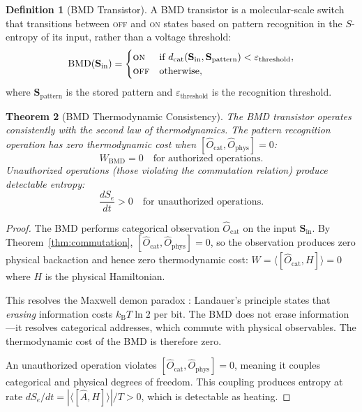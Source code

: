 \documentclass[12pt]{article}
\newtheorem{theorem}{Theorem}[section]
\theoremstyle{definition}
\newtheorem{definition}[theorem]{Definition}
\theoremstyle{remark}
\newcommand{\Se}{S_e}
\newcommand{\kB}{k_{\mathrm{B}}}
\newcommand{\Ocat}{\hat{O}_{\mathrm{cat}}}
\newcommand{\Ophys}{\hat{O}_{\mathrm{phys}}}
\begin{document}
\begin{definition}[BMD Transistor]
\label{def:bmd}
A BMD transistor is a molecular-scale switch that transitions between \textsc{off} and \textsc{on} states based on pattern recognition in the $S$-entropy of its input, rather than a voltage threshold:
\begin{equation}
  \mathrm{BMD}(\mathbf{S}_{\mathrm{in}}) =
  \begin{cases}
    \textsc{on} & \text{if } d_{\mathrm{cat}}(\mathbf{S}_{\mathrm{in}}, \mathbf{S}_{\mathrm{pattern}}) < \varepsilon_{\mathrm{threshold}}, \\
    \textsc{off} & \text{otherwise},
  \end{cases}
  \label{eq:bmd}
\end{equation}
where $\mathbf{S}_{\mathrm{pattern}}$ is the stored pattern and $\varepsilon_{\mathrm{threshold}}$ is the recognition threshold.
\end{definition}

\begin{theorem}[BMD Thermodynamic Consistency]
\label{thm:bmd_thermo}
The BMD transistor operates consistently with the second law of thermodynamics. The pattern recognition operation has zero thermodynamic cost when $[\Ocat, \Ophys] = 0$:
\begin{equation}
  W_{\mathrm{BMD}} = 0 \quad \text{for authorized operations}.
  \label{eq:bmd_work}
\end{equation}
Unauthorized operations (those violating the commutation relation) produce detectable entropy:
\begin{equation}
  \frac{d\Se}{dt} > 0 \quad \text{for unauthorized operations}.
  \label{eq:bmd_unauthorized}
\end{equation}
\end{theorem}

\begin{proof}
The BMD performs categorical observation $\Ocat$ on the input $\mathbf{S}_{\mathrm{in}}$. By Theorem~\ref{thm:commutation}, $[\Ocat, \Ophys] = 0$, so the observation produces zero physical backaction and hence zero thermodynamic cost: $W = \langle[\Ocat, H]\rangle = 0$ where $H$ is the physical Hamiltonian.

This resolves the Maxwell demon paradox \cite{bennett1982thermodynamics, landauer1961irreversibility}: Landauer's principle states that \emph{erasing} information costs $\kB T \ln 2$ per bit. The BMD does not erase information---it resolves categorical addresses, which commute with physical observables. The thermodynamic cost of the BMD is therefore zero.

An unauthorized operation violates $[\Ocat, \Ophys] = 0$, meaning it couples categorical and physical degrees of freedom. This coupling produces entropy at rate $d\Se/dt = |\langle[\hat{A}, H]\rangle|/T > 0$, which is detectable as heating.
\end{proof}
\end{document}
